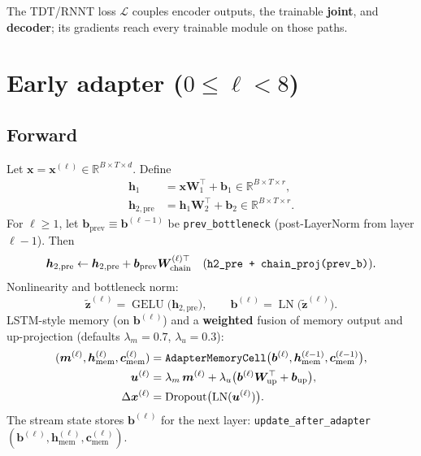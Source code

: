 \documentclass[11pt]{article}
\newcommand{\R}{\mathbb{R}}
\newcommand{\gelu}{\operatorname{GELU}}
\newcommand{\LN}{\operatorname{LN}}
\begin{document}
The TDT/RNNT loss $\mathcal{L}$ couples encoder outputs, the trainable \textbf{joint}, and \textbf{decoder}; its gradients reach every trainable module on those paths.

\section{Early adapter ($0\le \ell < 8$)}

\subsection{Forward}
Let $\bm{x}=\bm{x}^{(\ell)} \in \R^{B\times T\times d}$. Define
\begin{align}
  \bm{h}_1 &= \bm{x}\bm{W}_1^\top + \bm{b}_1 \in \R^{B\times T\times r}, \\
  \bm{h}_{2,\mathrm{pre}} &= \bm{h}_1 \bm{W}_2^\top + \bm{b}_2 \in \R^{B\times T\times r}.
\end{align}
For $\ell\ge 1$, let $\bm{b}_{\mathrm{prev}} \equiv \bm{b}^{(\ell-1)}$ be \texttt{prev\_bottleneck} (post-LayerNorm from layer $\ell-1$). Then
\begin{equation}
  \bm{h}_{2,\mathrm{pre}} \leftarrow \bm{h}_{2,\mathrm{pre}} + \bm{b}_{\mathrm{prev}} \bm{W}_{\mathrm{chain}}^{(\ell)\top}
  \quad\text{(\texttt{h2\_pre + chain\_proj(prev\_b)}).}
\end{equation}
Nonlinearity and bottleneck norm:
\begin{equation}
  \tilde{\bm{z}}^{(\ell)} = \gelu\!\bigl(\bm{h}_{2,\mathrm{pre}}\bigr), \qquad
  \bm{b}^{(\ell)} = \LN\bigl(\tilde{\bm{z}}^{(\ell)}\bigr).
\end{equation}
LSTM-style memory (on $\bm{b}^{(\ell)}$) and a \textbf{weighted} fusion of memory output and up-projection (defaults $\lambda_m=0.7$, $\lambda_u=0.3$):
\begin{align}
  (\bm{m}^{(\ell)}, \bm{h}_{\mathrm{mem}}^{(\ell)}, \bm{c}_{\mathrm{mem}}^{(\ell)}) &= \text{\texttt{AdapterMemoryCell}}\bigl(\bm{b}^{(\ell)}, \bm{h}_{\mathrm{mem}}^{(\ell-1)}, \bm{c}_{\mathrm{mem}}^{(\ell-1)}\bigr), \\
  \bm{u}^{(\ell)} &= \lambda_m\, \bm{m}^{(\ell)} + \lambda_u \bigl(\bm{b}^{(\ell)}\bm{W}_{\mathrm{up}}^\top + \bm{b}_{\mathrm{up}}\bigr), \\
  \Delta\bm{x}^{(\ell)} &= \text{Dropout}\bigl(\LN(\bm{u}^{(\ell)})\bigr).
\end{align}
The stream state stores $\bm{b}^{(\ell)}$ for the next layer: \texttt{update\_after\_adapter}$(\bm{b}^{(\ell)}, \bm{h}_{\mathrm{mem}}^{(\ell)}, \bm{c}_{\mathrm{mem}}^{(\ell)})$.
\end{document}
